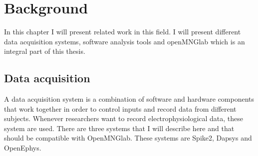 \chapter{Background}
In this chapter I will present related work in this field. I will present different data acquisition systems, software analysis tools and openMNGlab which is an integral part of this thesis.\\

\section{Data acquisition} 
A data acquisition system is a combination of software and hardware components that work together in order to control inputs and record data from different subjects. Whenever researchers want to record electrophysiological data, these system are used.
There are three systems that I will describe here and that should be compatible with OpenMNGlab. These systems are Spike2, Dapsys and OpenEphys.

